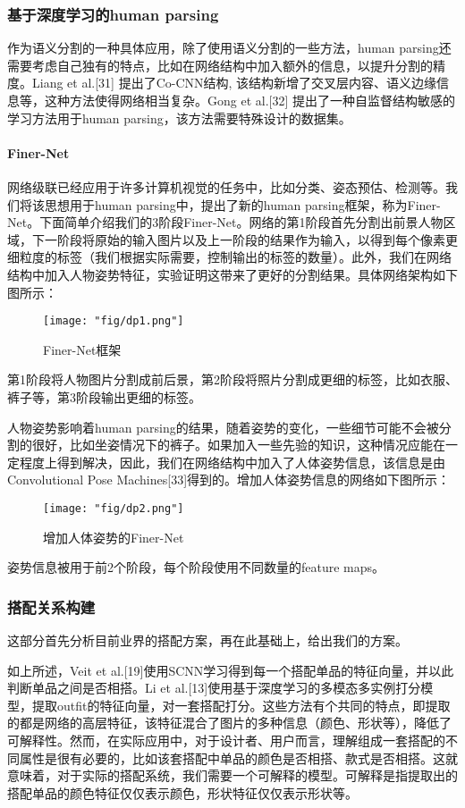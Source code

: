 \subsubsection{基于深度学习的human parsing}
作为语义分割的一种具体应用，除了使用语义分割的一些方法，human parsing还需要考虑自己独有的特点，比如在网络结构中加入额外的信息，以提升分割的精度。Liang et al.[31] 提出了Co-CNN结构, 该结构新增了交叉层内容、语义边缘信息等，这种方法使得网络相当复杂。Gong et al.[32] 提出了一种自监督结构敏感的学习方法用于human parsing，该方法需要特殊设计的数据集。

\paragraph{Finer-Net}
网络级联已经应用于许多计算机视觉的任务中，比如分类、姿态预估、检测等。我们将该思想用于human parsing中，提出了新的human parsing框架，称为Finer-Net。下面简单介绍我们的3阶段Finer-Net。网络的第1阶段首先分割出前景人物区域，下一阶段将原始的输入图片以及上一阶段的结果作为输入，以得到每个像素更细粒度的标签（我们根据实际需要，控制输出的标签的数量）。此外，我们在网络结构中加入人物姿势特征，实验证明这带来了更好的分割结果。具体网络架构如下图所示：

\begin{figure}[!h]
	\centering
	\texttt{[image: "fig/dp1.png"]}
	\caption{Finer-Net框架}
	\label{fig:dp1}
\end{figure}
第1阶段将人物图片分割成前后景，第2阶段将照片分割成更细的标签，比如衣服、裤子等，第3阶段输出更细的标签。

\par 人物姿势影响着human parsing的结果，随着姿势的变化，一些细节可能不会被分割的很好，比如坐姿情况下的裤子。如果加入一些先验的知识，这种情况应能在一定程度上得到解决，因此，我们在网络结构中加入了人体姿势信息，该信息是由Convolutional Pose Machines[33]得到的。增加人体姿势信息的网络如下图所示：
\begin{figure}[!h]
	\centering
	\texttt{[image: "fig/dp2.png"]}
	\caption{增加人体姿势的Finer-Net}
	\label{fig:dp2}
\end{figure}
姿势信息被用于前2个阶段，每个阶段使用不同数量的feature maps。


\subsubsection{搭配关系构建}
这部分首先分析目前业界的搭配方案，再在此基础上，给出我们的方案。

\par 如上所述，Veit et al.[19]使用SCNN学习得到每一个搭配单品的特征向量，并以此判断单品之间是否相搭。Li et al.[13]使用基于深度学习的多模态多实例打分模型，提取outfit的特征向量，对一套搭配打分。这些方法有个共同的特点，即提取的都是网络的高层特征，该特征混合了图片的多种信息（颜色、形状等），降低了可解释性。然而，在实际应用中，对于设计者、用户而言，理解组成一套搭配的不同属性是很有必要的，比如该套搭配中单品的颜色是否相搭、款式是否相搭。这就意味着，对于实际的搭配系统，我们需要一个可解释的模型。可解释是指提取出的搭配单品的颜色特征仅仅表示颜色，形状特征仅仅表示形状等。


